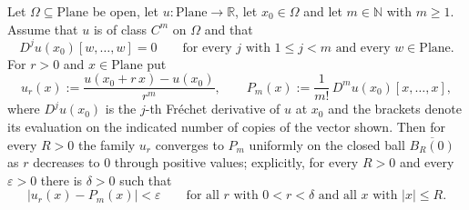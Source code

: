 \begin{lemma}
Let $\Omega\subseteq\mathrm{Plane}$ be open, let $u\colon\mathrm{Plane}\to\mathbb{R}$, let
$x_0\in\Omega$ and let $m\in\mathbb{N}$ with $m\ge1$.  Assume that $u$ is of class $C^{m}$ on
$\Omega$ and that
\[
  D^{j}u(x_0)[w,\ldots,w]=0\qquad\text{for every }j\text{ with }1\le j<m
  \text{ and every }w\in\mathrm{Plane}.
\]
For $r>0$ and $x\in\mathrm{Plane}$ put
\[
  u_r(x):=\frac{u(x_0+r\,x)-u(x_0)}{r^{m}},\qquad
  P_m(x):=\frac{1}{m!}\,D^{m}u(x_0)[x,\ldots,x],
\]
where $D^{j}u(x_0)$ is the $j$-th Fr\'echet derivative of $u$ at $x_0$ and the brackets denote
its evaluation on the indicated number of copies of the vector shown.  Then for every $R>0$ the
family $u_r$ converges to $P_m$ uniformly on the closed ball $\overline{B_R(0)}$ as $r$
decreases to $0$ through positive values; explicitly, for every $R>0$ and every
$\varepsilon>0$ there is $\delta>0$ such that
\[
  \lvert u_r(x)-P_m(x)\rvert<\varepsilon
  \qquad\text{for all }r\text{ with }0<r<\delta\text{ and all }x\text{ with }\lvert x\rvert\le R.
\]
\end{lemma}
